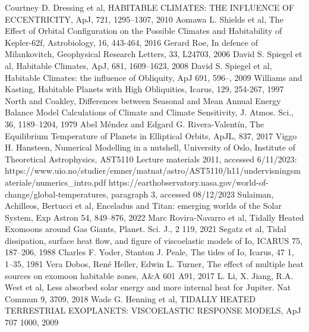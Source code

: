 \documentclass[12pt, onecolumn]{revtex4-2}    %
\begin{document}

\begin{thebibliography}{}
     Courtney D. Dressing et al, HABITABLE CLIMATES: THE INFLUENCE OF ECCENTRICITY, ApJ, 721, 1295--1307, 2010
     Aomawa L. Shields et al, The Effect of Orbital Configuration on the Possible Climates and Habitability of Kepler-62f, Astrobiology, 16, 443-464, 2016
     Gerard Roe, In defence of Milankovitch, Geophysical Research Letters, 33, L24703, 2006
     David S. Spiegel et al, Habitable Climates, ApJ, 681, 1609--1623, 2008
     David S. Spiegel et al, Habitable Climates: the influence of Obliquity, ApJ 691, 596--, 2009
     Williams and Kasting, Habitable Planets with High Obliquities, Icarus, 129, 254-267, 1997
     North and Coakley, Differences between Seasonal and Mean Annual Energy Balance Model Calculations of Climate and Climate Sensitivity, J. Atmos. Sci., 36, 1189--1204, 1979
     Abel Méndez and Edgard G. Rivera-Valentín, The Equilibrium Temperature of Planets in Elliptical Orbits, ApJL, 837, 2017
     Viggo H. Hansteen, Numerical Modelling in a nutshell, University of Oslo, Institute of Theoretical Astrophysics, AST5110 Lecture materials 2011, accessed 6/11/2023: https://www.uio.no/studier/emner/matnat/astro/AST5110/h11/undervisningsmateriale/numerics\_intro.pdf
     https://earthobservatory.nasa.gov/world-of-change/global-temperatures, paragraph 3, accessed 08/12/2023
     Sulaiman, Achilleos, Bertucci et al, Enceladus and Titan: emerging worlds of the Solar System, Exp Astron 54, 849--876, 2022
     Marc Rovira-Navarro et al, Tidally Heated Exomoons around Gas Giants, Planet. Sci. J., 2 119, 2021
     Segatz et al, Tidal dissipation, surface heat flow, and figure of viscoelastic models of Io, ICARUS 75, 187--206, 1988
     Charles F. Yoder, Stanton J. Peale, The tides of Io, Icarus, 47 1, 1--35, 1981
     Vera Dobos, René Heller, Edwin L. Turner, The effect of multiple heat sources on exomoon habitable zones, A\&A 601 A91, 2017
     L. Li, X. Jiang, R.A. West et al, Less absorbed solar energy and more internal heat for Jupiter. Nat Commun 9, 3709, 2018
     Wade G. Henning et al, TIDALLY HEATED TERRESTRIAL EXOPLANETS: VISCOELASTIC RESPONSE MODELS, ApJ 707 1000, 2009
\end{thebibliography}
\end{document}
